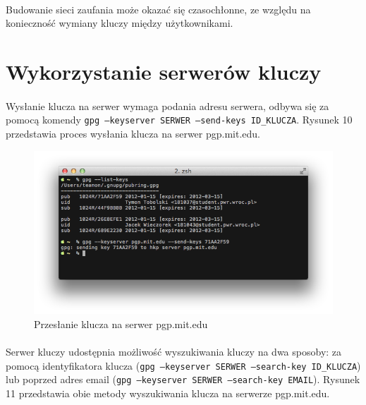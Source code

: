 \documentclass[wide,a4paper,titlepage,12pt] {article}
\begin{document}
  \paragraph{}
  Budowanie sieci zaufania może okazać się czasochłonne, ze względu na konieczność wymiany kluczy między użytkownikami.

  \newpage

  \section{Wykorzystanie serwerów kluczy}
  \paragraph{}
  Wysłanie klucza na serwer wymaga podania adresu serwera, odbywa się za pomocą komendy \texttt{gpg --keyserver SERWER --send-keys ID\_KLUCZA}. Rysunek 10 przedstawia proces wysłania klucza na serwer pgp.mit.edu.

  \begin{figure}[h!]
    \begin{center}
      \includegraphics[width=\textwidth]{img/10.png}
      \caption{Przesłanie klucza na serwer pgp.mit.edu}
    \end{center}
  \end{figure}

  \paragraph{}
  Serwer kluczy udostępnia możliwość wyszukiwania kluczy na dwa sposoby: za pomocą identyfikatora klucza (\texttt{gpg --keyserver SERWER --search-key ID\_KLUCZA}) lub poprzed adres email (\texttt{gpg --keyserver SERWER --search-key EMAIL}). Rysunek 11 przedstawia obie metody wyszukiwania klucza na serwerze pgp.mit.edu.
\end{document}
